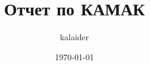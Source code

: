 \def\usetitle{}
\def\usegraphics{}



\title{Отчет по КАМАК}
\def\subtitle{....}
\def\edition{[reports]\ \#\ 1}
\author{kalaider}
\date{\today}


	
	\ifdefined\usetitle
	    
	\fi
	
	

